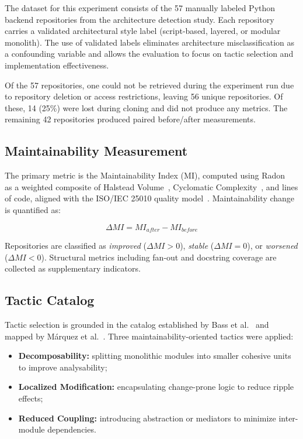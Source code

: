 \documentclass[sigconf,review,anonymous]{acmart}
\begin{document}
The dataset for this experiment consists of the 57 manually labeled Python backend repositories from the architecture detection study. Each repository carries a validated architectural style label (script-based, layered, or modular monolith). The use of validated labels eliminates architecture misclassification as a confounding variable and allows the evaluation to focus on tactic selection and implementation effectiveness.

Of the 57 repositories, one could not be retrieved during the experiment run due to repository deletion or access restrictions, leaving 56 unique repositories. Of these, 14 (25\%) were lost during cloning and did not produce any metrics. The remaining 42 repositories produced paired before/after measurements.

\subsection{Maintainability Measurement}

The primary metric is the Maintainability Index (MI), computed using Radon~\cite{oman1992maintainability} as a weighted composite of Halstead Volume~\cite{halstead1977elements}, Cyclomatic Complexity~\cite{mccabe1976complexity}, and lines of code, aligned with the ISO/IEC 25010 quality model~\cite{ISO25010}. Maintainability change is quantified as:

\begin{equation}
\Delta MI = MI_{after} - MI_{before}
\end{equation}

Repositories are classified as \textit{improved} ($\Delta MI > 0$), \textit{stable} ($\Delta MI = 0$), or \textit{worsened} ($\Delta MI < 0$). Structural metrics including fan-out and docstring coverage are collected as supplementary indicators.

\subsection{Tactic Catalog}

Tactic selection is grounded in the catalog established by Bass et al.~\cite{bass2021software} and mapped by M\'arquez et al.~\cite{marquez2022architectural}. Three maintainability-oriented tactics were applied:

\begin{itemize}[nosep]
    \item \textbf{Decomposability:} splitting monolithic modules into smaller cohesive units to improve analysability;
    \item \textbf{Localized Modification:} encapsulating change-prone logic to reduce ripple effects;
    \item \textbf{Reduced Coupling:} introducing abstraction or mediators to minimize inter-module dependencies.
\end{itemize}
\end{document}
